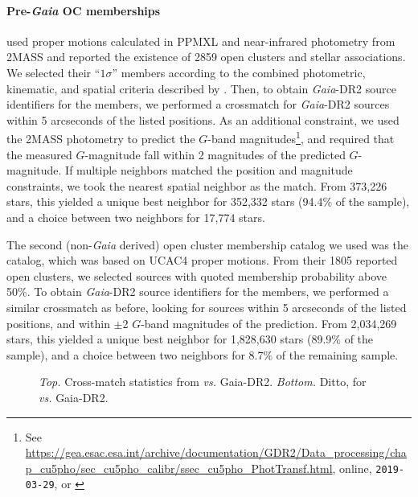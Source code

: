 \documentclass[12pt,twocolumn,tighten]{aastex62}
\begin{document}
\paragraph{Pre-{\it Gaia} OC memberships}
\citet{Kharchenko_et_al_2013} used proper motions calculated in PPMXL
\citep[][a combination of USNO-B1{.}0 and 2MASS
astrometry]{roeser_ppmxl_2010} and near-infrared photometry from 2MASS
\citep{skrutskie_tmass_2006} and reported the existence of 2859 open
clusters and stellar associations.
We selected their ``$1\sigma$'' members according to the
combined photometric, kinematic, and spatial criteria described by
\citet{kharchenko_global_2012}.  Then, to obtain {\it Gaia}-DR2 source
identifiers for the members, we performed a crossmatch for {\it
Gaia}-DR2 sources within 5 arcseconds of the listed positions.  As an
additional constraint, we used the 2MASS photometry to predict the
$G$-band magnitudes\footnote{See
\url{https://gea.esac.esa.int/archive/documentation/GDR2/Data_processing/chap_cu5pho/sec_cu5pho_calibr/ssec_cu5pho_PhotTransf.html},
online, \texttt{2019-03-29}, or \citet{carrasco_gaia_2016}}, and
required that the measured $G$-magnitude fall within 2 magnitudes of
the predicted $G$-magnitude.  If multiple neighbors matched the
position and magnitude constraints, we took the nearest spatial
neighbor as the match.  From 373{,}226 stars, this yielded a unique
best neighbor for 352{,}332 stars (94.4\% of the sample), and a choice
between two neighbors for 17{,}774 stars. 

The second (non-{\it Gaia} derived) open cluster membership catalog we
used was the \citet{dias_proper_2014} catalog, which was based on
UCAC4 proper motions.
From their 1805 reported open clusters, we selected sources with
quoted membership probability above 50\%.
To obtain {\it Gaia}-DR2 source identifiers for the members, we
performed a similar crossmatch as before, looking for sources within 5
arcseconds of the listed positions, and within $\pm$2 $G$-band
magnitudes of the prediction.
From 2{,}034{,}269 stars, this yielded a unique
best neighbor for 1{,}828{,}630 stars (89.9\% of the sample), and a choice
between two neighbors for 8.7\% of the remaining sample. 

\begin{figure}[!ht]
  \vspace{-0.8cm}
  \caption{
      {\it Top.} Cross-match statistics from \cite{Kharchenko_et_al_2013} {\it 
      vs.} Gaia-DR2.
      {\it Bottom.} Ditto, for \cite{dias_proper_2014} {\it vs.} Gaia-DR2.
  }
  \label{fig:xmatch_info}
\end{figure}
\end{document}
